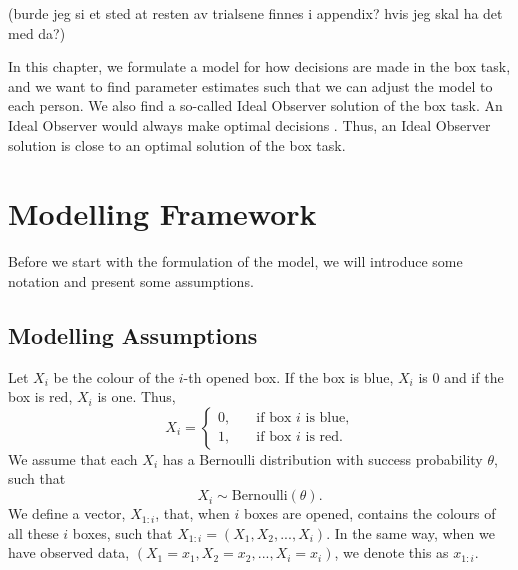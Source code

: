 (burde jeg si et sted at resten av trialsene finnes i appendix? hvis jeg skal ha det med da?)

In this chapter, we formulate a model for how decisions are made in the box task, and we want to find parameter estimates such that we can adjust the model to each person. We also find a so-called Ideal Observer solution of the box task. An Ideal Observer would always make optimal decisions \citep{idealObs}. Thus, an Ideal Observer solution is close to an optimal solution of the box task. 



\section{Modelling Framework}
Before we start with the formulation of the model, we will introduce some notation and present some assumptions. 

\subsection{Modelling Assumptions}
\label{section_notation}
Let $X_i$ be the colour of the $i$-th opened box. If the box is blue, $X_i$ is 0 and if the box is red, $X_i$ is one. Thus,
\begin{equation*}
    X_i = \begin{cases}
    0,& \quad \text{if box } i \text{ is blue,}\\
    1,& \quad \text{if box } i \text{ is red.}
    \end{cases}
\end{equation*}
We assume that each $X_i$ has a Bernoulli distribution with success probability $\theta$, such that
\begin{equation*}
    X_i \sim \text{Bernoulli}(\theta).
\end{equation*}
We define a vector, $X_{1:i}$, that, when $i$ boxes are opened,
contains the colours of all these $i$ boxes, such that $X_{1:i} = (X_1,X_2,...,X_{i})$. In the same way, when we have observed data, $(X_1=x_1,X_2=x_2,...,X_i=x_i)$, we denote this as $x_{1:i}$.

